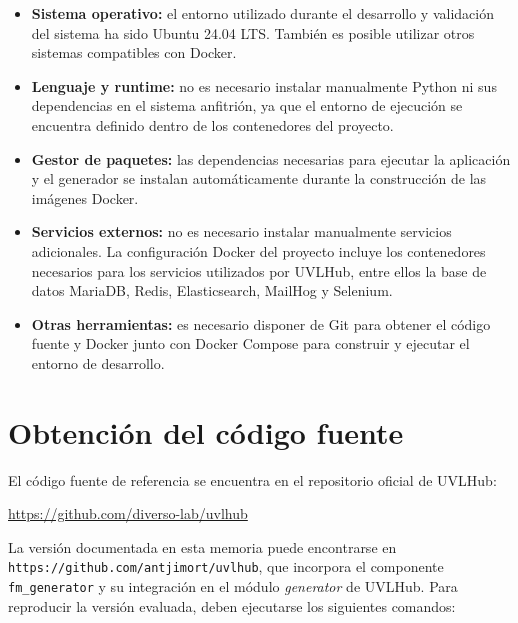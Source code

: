\begin{itemize}
    \item \textbf{Sistema operativo:} el entorno utilizado durante el
    desarrollo y validación del sistema ha sido Ubuntu 24.04 LTS. También es
    posible utilizar otros sistemas compatibles con Docker.

    \item \textbf{Lenguaje y runtime:} no es necesario instalar manualmente
    Python ni sus dependencias en el sistema anfitrión, ya que el entorno de
    ejecución se encuentra definido dentro de los contenedores del proyecto.

    \item \textbf{Gestor de paquetes:} las dependencias necesarias para
    ejecutar la aplicación y el generador se instalan automáticamente durante
    la construcción de las imágenes Docker.

    \item \textbf{Servicios externos:} no es necesario instalar manualmente
    servicios adicionales. La configuración Docker del proyecto incluye los
    contenedores necesarios para los servicios utilizados por UVLHub, entre
    ellos la base de datos MariaDB, Redis, Elasticsearch, MailHog y Selenium.

    \item \textbf{Otras herramientas:} es necesario disponer de Git para
    obtener el código fuente y Docker junto con Docker Compose para construir y
    ejecutar el entorno de desarrollo.
\end{itemize}

\section{Obtención del código fuente}
\label{sec:obtencion_codigo}

El código fuente de referencia se encuentra en el repositorio oficial de
UVLHub:

\begin{center}
\url{https://github.com/diverso-lab/uvlhub}
\end{center}

La versión documentada en esta memoria puede encontrarse en
\texttt{https://github.com/antjimort/uvlhub}, que incorpora el componente \texttt{fm\_generator} y
su integración en el módulo \textit{generator} de UVLHub. Para reproducir la
versión evaluada, deben ejecutarse los siguientes comandos:

